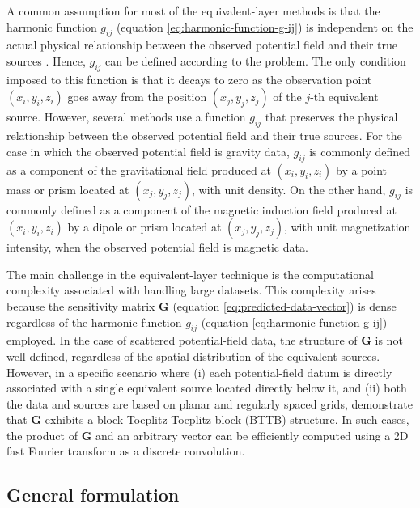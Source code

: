 A common assumption for most of the equivalent-layer methods is that the harmonic function $g_{ij}$ 
(equation \ref{eq:harmonic-function-g-ij}) is independent on the actual physical relationship between the
observed potential field and their true sources \cite[e.g.,][]{cordell1992, guspi-novara2009,li_etal_2014}.
Hence, $g_{ij}$ can be defined according to the problem.
The only condition imposed to this function is that it decays to zero as the observation point $(x_{i}, y_{i}, z_{i})$
goes away from the position $(x_{j}, y_{j}, z_{j})$ of the $j$-th equivalent source.
However, several methods use a function $g_{ij}$ that preserves the physical relationship between the
observed potential field and their true sources.
For the case in which the observed potential field is gravity data, $g_{ij}$ is commonly defined as a component of 
the gravitational field produced at $(x_{i}, y_{i}, z_{i})$ by a point mass or prism located at $(x_{j}, y_{j}, z_{j})$, with unit density.
On the other hand, $g_{ij}$ is commonly defined as a component of the 
magnetic induction field produced at $(x_{i}, y_{i}, z_{i})$ by a dipole or prism located at $(x_{j}, y_{j}, z_{j})$,
with unit magnetization intensity, when the observed potential field is magnetic data.

The main challenge in the equivalent-layer technique is the computational complexity associated with handling large datasets. 
This complexity arises because the sensitivity matrix $\mathbf{G}$ (equation \ref{eq:predicted-data-vector}) is dense regardless of the 
harmonic function $g_{ij}$ (equation \ref{eq:harmonic-function-g-ij}) employed. 
In the case of scattered potential-field data, the structure of $\mathbf{G}$  is not well-defined, regardless of the spatial distribution 
of the equivalent sources.
However, in a specific scenario where (i) each potential-field datum is directly associated with a single equivalent source located directly below it, 
and (ii) both the data and sources are based on planar and regularly spaced grids,  \citet{takahashi-etal2020,takahashi-etal2022} demonstrate that 
$\mathbf{G}$ exhibits a block-Toeplitz Toeplitz-block (BTTB) structure. 
In such cases, the product of $\mathbf{G}$ and an arbitrary vector can be efficiently computed using a 2D fast Fourier transform as a discrete convolution.

\subsection{General formulation}
\label{subsec:general-formulation}


